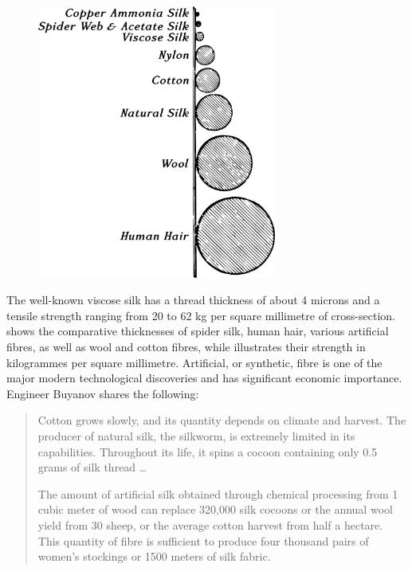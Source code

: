 \begin{figure}[h!]
\centering
\includegraphics[width=0.7\textwidth]{figures/ch-11/fig-163a.pdf}
\end{figure}



The well-known viscose silk has a thread thickness of about 4 microns and a tensile strength ranging from 20 to 62 kg per square millimetre of cross-section.  shows the comparative thicknesses of spider silk, human hair, various artificial fibres, as well as wool and cotton fibres, while  illustrates their strength in kilogrammes per square millimetre. Artificial, or synthetic, fibre is one of the major modern technological discoveries and has significant economic importance. Engineer Buyanov shares the following:

\begin{quote}
Cotton grows slowly, and its quantity depends on climate and harvest. The producer of natural silk, the silkworm, is extremely limited in its capabilities. Throughout its life, it spins a cocoon containing only 0.5 grams of silk thread \dots{}

The amount of artificial silk obtained through chemical processing from 1 cubic meter of wood can replace 320,000 silk cocoons or the annual wool yield from 30 sheep, or the average cotton harvest from half a hectare. This quantity of fibre is sufficient to produce four thousand pairs of women's stockings or 1500 meters of silk fabric.
\end{quote}




